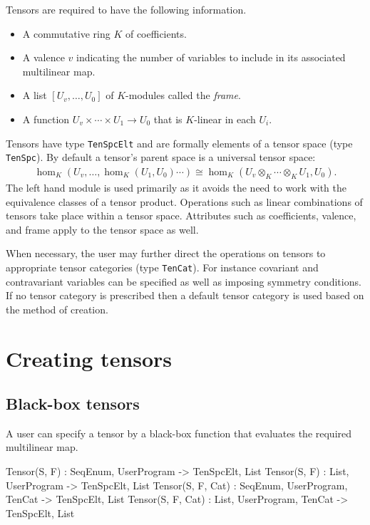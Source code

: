 
Tensors are required to have the following information.
\begin{itemize}
\item A commutative ring $K$ of coefficients.
\item A valence $v$ indicating the number of variables to include in its 
associated multilinear map.
\item A list $[U_v,\dots, U_0]$ of $K$-modules called the {\em frame}.
\item A function $U_v\times \cdots \times U_1\to U_0$ that is $K$-linear in 
each $U_i$.
\end{itemize}
Tensors have type {\tt TenSpcElt} and are formally elements of a tensor space 
(type {\tt TenSpc}).  By default a tensor's parent space is a universal tensor space:
\begin{align*}
	\hom_K(U_v,\dots,\hom_K(U_1,U_0)\cdots) \cong \hom_K(U_v\otimes_K\cdots \otimes_K U_1,U_0).
\end{align*}
The left hand module is used primarily as it avoids the need to work with 
the equivalence classes of a tensor product.
Operations such as linear combinations of tensors take place within a  
tensor space.
Attributes such as coefficients, valence, and frame  apply to the tensor space 
as well.

When necessary, the user may further direct the operations on tensors to 
appropriate tensor categories 
(type {\tt TenCat}).  For instance covariant and contravariant variables can 
be specified
as well as imposing symmetry conditions.  If no tensor category is prescribed
then a default tensor category is used based on the method of creation.
\medskip

\minitoc

\section{Creating tensors}

\subsection{Black-box tensors}
A user can specify a tensor by a black-box function that evaluates the required
multilinear map.

\begin{intrinsics}
Tensor(S, F) : SeqEnum, UserProgram -> TenSpcElt, List
Tensor(S, F) : List, UserProgram -> TenSpcElt, List
Tensor(S, F, Cat) : SeqEnum, UserProgram, TenCat -> TenSpcElt, List
Tensor(S, F, Cat) : List, UserProgram, TenCat -> TenSpcElt, List
\end{intrinsics}

